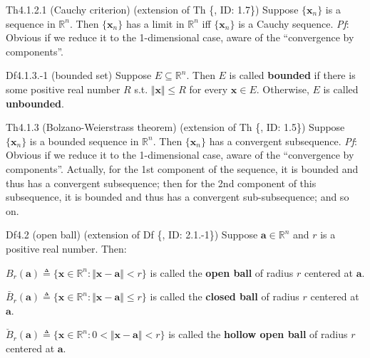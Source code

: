\documentclass{article}
\begin{document}
\begin{Th}{Th4.1.2.1 (Cauchy criterion) (extension of Th \{, ID: 1.7\})}
    Suppose $\{\pmb{x}_n\}$ is a sequence in $\mathbb{R}^n$. Then $\{\pmb{x}_n\}$ has a limit in $\mathbb{R}^n$ iff $\{\pmb{x}_n\}$ is a Cauchy sequence.
    \tcblower
    \textit{Pf}: Obvious if we reduce it to the 1-dimensional case, aware of the ``convergence by components''.
\end{Th}

\begin{Df}{Df4.1.3.-1 (bounded set)}
    Suppose $E\subseteq\mathbb{R}^n$. Then $E$ is called \textbf{bounded} if there is some positive real number $R$ s.t. $\Vert\pmb{x}\Vert\leq R$ for every $\pmb{x}\in E$. Otherwise, $E$ is called \textbf{unbounded}.
\end{Df}

\begin{Th}{Th4.1.3 (Bolzano-Weierstrass theorem) (extension of Th \{, ID: 1.5\})}
    Suppose $\{\pmb{x}_n\}$ is a bounded sequence in $\mathbb{R}^n$. Then $\{\pmb{x}_n\}$ has a convergent subsequence.
    \tcblower
    \textit{Pf}: Obvious if we reduce it to the 1-dimensional case, aware of the ``convergence by components''. Actually, for the 1st component of the sequence, it is bounded and thus has a convergent subsequence; then for the 2nd component of this subsequence, it is bounded and thus has a convergent sub-subsequence; and so on.
\end{Th}

\begin{Df}{Df4.2 (open ball) (extension of Df \{, ID: 2.1.-1\})}
    Suppose $\pmb{a}\in\mathbb{R}^n$ and $r$ is a positive real number. Then:
    \begin{compactenum}
        \item $B_r(\pmb{a})\triangleq \{\pmb{x}\in\mathbb{R}^n: \Vert \pmb{x}-\pmb{a}\Vert < r\}$ is called the \textbf{open ball} of radius $r$ centered at $\pmb{a}$.
        \item $\bar{B}_r(\pmb{a})\triangleq \{\pmb{x}\in\mathbb{R}^n: \Vert \pmb{x}-\pmb{a}\Vert \leq r\}$ is called the \textbf{closed ball} of radius $r$ centered at $\pmb{a}$.
        \item $\check{B}_r(\pmb{a})\triangleq \{\pmb{x}\in\mathbb{R}^n: 0 < \Vert \pmb{x}-\pmb{a}\Vert < r\}$ is called the \textbf{hollow open ball} of radius $r$ centered at $\pmb{a}$.
    \end{compactenum}
\end{Df}
\end{document}
